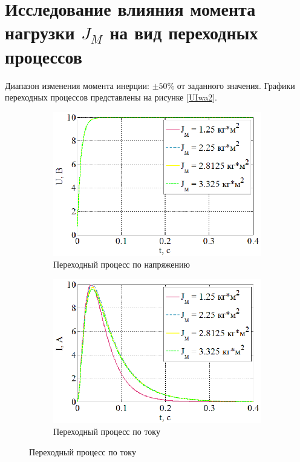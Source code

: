 \documentclass[a4paper,12pt]{article} %
\begin{document}
\section{Исследование влияния момента нагрузки $J_M$ на вид переходных процессов}
Диапазон изменения момента инерции: $\pm 50\%$  от заданного значения. Графики переходных процессов представлены на рисунке \ref{UIwa2}.
\begin{figure}[H]
	\centering
	\begin{subfigure}[b]{0.48\textwidth}
	    \includegraphics[width = \textwidth]{scheme/U2}
		\caption{Переходный процесс по напряжению}
	\end{subfigure}
	\hfill
	\begin{subfigure}[b]{0.48\textwidth}
		\includegraphics[width = \textwidth]{scheme/I2}
		\caption{Переходный процесс по току}
	\end{subfigure}

\end{figure}
\end{document}
